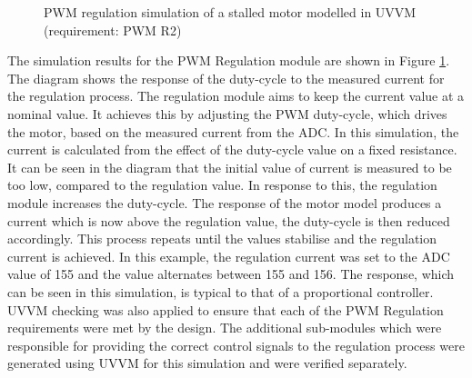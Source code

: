 \begin{figure}[h]
\centering
{}
\caption{PWM regulation simulation of a stalled motor modelled in UVVM (requirement: PWM R2)}
\label{regulation_sim}
\end{figure}

The simulation results for the PWM Regulation module are shown in Figure \ref{regulation_sim}. The diagram shows the response of the duty-cycle to the measured current for the regulation process. The regulation module aims to keep the current value at a nominal value. It achieves this by adjusting the PWM duty-cycle, which drives the motor, based on the measured current from the ADC. In this simulation, the current is calculated from the effect of the duty-cycle value on a fixed resistance. It can be seen in the diagram that the initial value of current is measured to be too low, compared to the regulation value. In response to this, the regulation module increases the duty-cycle. The response of the motor model produces a current which is now above the regulation value, the duty-cycle is then reduced accordingly. This process repeats until the values stabilise and the regulation current is achieved. In this example, the regulation current was set to the ADC value of 155 and the value alternates between 155 and 156. The response, which can be seen in this simulation, is typical to that of a proportional controller. UVVM checking was also applied to ensure that each of the PWM Regulation requirements were met by the design. The additional sub-modules which were responsible for providing the correct control signals to the regulation process were generated using UVVM for this simulation and were verified separately.

